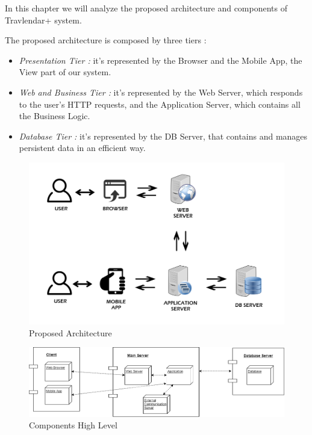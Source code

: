 \vspace*{-5mm}

In this chapter we will analyze the proposed architecture and components of Travlendar+ system.\par
The proposed architecture is composed by three tiers :
\begin{itemize}
	\setlength{\leftskip}{0.5cm}
	\item \emph{Presentation Tier : }it's represented by the Browser and the Mobile App, the View part of our system.
	\item \emph{Web and Business Tier : }it's represented by the Web Server, which responds to the user's HTTP requests, and the Application Server, which contains all the Business Logic.
	\item \emph{Database Tier : }it's represented by the DB Server, that contains and manages persistent data in an efficient way.
\end{itemize}
\begin{figure}[H]
	\centering
	\includegraphics[scale=0.35]{Images/Architecture/Proposed_Architecture}
	\caption{Proposed Architecture}
\end{figure}

\begin{figure}[H]
	\centering
	\includegraphics[scale=0.35]{Images/Architecture/Components_High_Level}
	\caption{Components High Level}
\end{figure}

